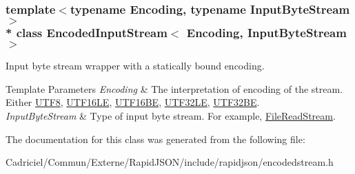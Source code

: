 \subsubsection*{template$<$typename Encoding, typename Input\+Byte\+Stream$>$\\*
class Encoded\+Input\+Stream$<$ Encoding, Input\+Byte\+Stream $>$}

Input byte stream wrapper with a statically bound encoding. 


\begin{DoxyTemplParams}{Template Parameters}
{\em Encoding} & The interpretation of encoding of the stream. Either \hyperlink{struct_u_t_f8}{U\+T\+F8}, \hyperlink{struct_u_t_f16_l_e}{U\+T\+F16\+LE}, \hyperlink{struct_u_t_f16_b_e}{U\+T\+F16\+BE}, \hyperlink{struct_u_t_f32_l_e}{U\+T\+F32\+LE}, \hyperlink{struct_u_t_f32_b_e}{U\+T\+F32\+BE}. \\
\hline
{\em Input\+Byte\+Stream} & Type of input byte stream. For example, \hyperlink{class_file_read_stream}{File\+Read\+Stream}. \\
\hline
\end{DoxyTemplParams}


The documentation for this class was generated from the following file\+:\begin{DoxyCompactItemize}
\item 
Cadriciel/\+Commun/\+Externe/\+Rapid\+J\+S\+O\+N/include/rapidjson/encodedstream.\+h\end{DoxyCompactItemize}
